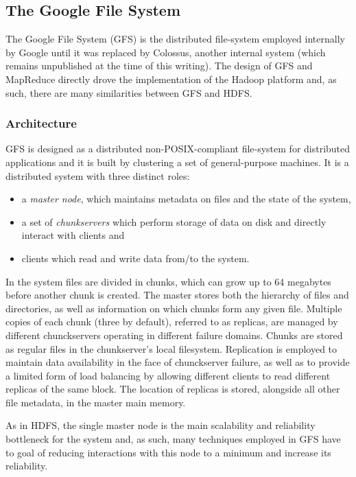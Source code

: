 \subsection{The Google File System}
The Google File System (GFS) \cite{DBLP:conf/sosp/GhemawatGL03} is the distributed file-system employed internally by Google until it was replaced by Colossus, another internal system (which remains unpublished at the time of this writing). 
The design of GFS and MapReduce \cite{DBLP:journals/cacm/DeanG08} directly drove the implementation of the Hadoop platform and, as such, there are many similarities between GFS and HDFS.

\subsubsection{Architecture}
GFS is designed as a distributed non-POSIX-compliant file-system for distributed applications and it is built by clustering a set of general-purpose machines.
It is a distributed system with three distinct roles: 
\begin{itemize}
    \item a \emph{master node}, which maintains metadata on files and the state of the system,
    \item a set of \emph{chunkservers} which perform storage of data on disk and directly interact with clients and
    \item clients which read and write data from/to the system.
\end{itemize}
In the system files are divided in chunks, which can grow up to 64 megabytes before another chunk is created.
The master stores both the hierarchy of files and directories, as well as information on which chunks form any given file.
Multiple copies of each chunk (three by default), referred to as replicas, are managed by different chunckservers operating in different failure domains.
Chunks are stored as regular files in the chunkserver's local filesystem.
Replication is employed to maintain data availability in the face of chunckserver failure, as well as to provide a limited form of load balancing by allowing different clients to read different replicas of the same block.
The location of replicas is stored, alongside all other file metadata, in the master main memory.

As in HDFS, the single master node is the main scalability and reliability bottleneck for the system and, as such, many techniques employed in GFS have to goal of reducing interactions with this node to a minimum and increase its reliability.
